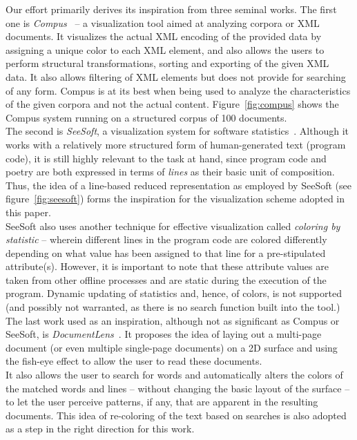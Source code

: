 \documentclass[10pt, twocolumn]{article}
\begin{document}
Our effort primarily derives its inspiration from three seminal works. The first one is \textit{Compus}~\cite{compus} -- a visualization tool aimed at analyzing corpora or XML documents. It visualizes the actual XML encoding of the provided data by assigning a unique color to each XML element, and also allows the users to perform structural transformations, sorting and exporting of the given XML data. It also allows filtering of XML elements but does not provide for searching of any form. Compus is at its best when being used to analyze the characteristics of the given corpora and not the actual content. Figure~\ref{fig:compus} shows the Compus system running on a structured corpus of 100 documents. \\

The second is \textit{SeeSoft}, a visualization system for software statistics~\cite{seesoft}. Although it works with a relatively more structured form of human-generated text (program code), it is still highly relevant to the task at hand, since program code and poetry are both expressed in terms of \textit{lines} as their basic unit of composition. Thus, the idea of a line-based reduced representation as employed by SeeSoft (see figure~\ref{fig:seesoft}) forms the inspiration for the visualization scheme adopted in this paper. \\

SeeSoft also uses another technique for effective visualization called \textit{coloring by statistic} -- wherein different lines in the program code are colored differently depending on what value has been assigned to that line for a pre-stipulated attribute(s). However, it is important to note that these attribute values are taken from other offline processes and are static during the execution of the program.  Dynamic updating of statistics and, hence, of colors, is not supported (and possibly not warranted, as there is no search function built into the tool.)  \\ 

The last work used as an inspiration, although not as significant as Compus or SeeSoft, is \textit{DocumentLens}~\cite{documentlens}. It proposes the idea of laying out a multi-page document (or even multiple single-page documents) on a 2D surface and using the fish-eye effect to allow the user to read these documents. \\

It also allows the user to search for words and automatically alters the colors of the matched words and lines -- without changing the basic layout of the surface -- to let the user perceive patterns, if any, that are apparent in the resulting documents. This idea of re-coloring of the text based on searches is also adopted as a step in the right direction for this work. \\
\end{document}
